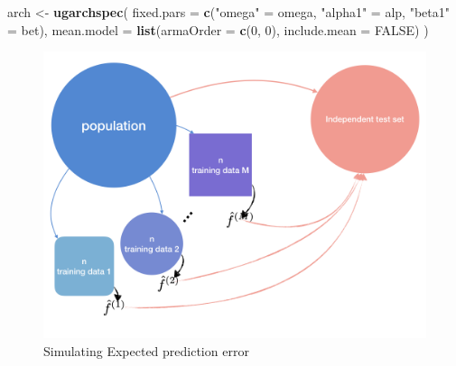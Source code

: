 \documentclass[
]{article}
\newenvironment{Shaded}{\begin{snugshade}}{\end{snugshade}}
\newcommand{\DataTypeTok}[1]{\textcolor[rgb]{0.13,0.29,0.53}{#1}}
\newcommand{\DecValTok}[1]{\textcolor[rgb]{0.00,0.00,0.81}{#1}}
\newcommand{\KeywordTok}[1]{\textcolor[rgb]{0.13,0.29,0.53}{\textbf{#1}}}
\newcommand{\NormalTok}[1]{#1}
\newcommand{\OtherTok}[1]{\textcolor[rgb]{0.56,0.35,0.01}{#1}}
\newcommand{\StringTok}[1]{\textcolor[rgb]{0.31,0.60,0.02}{#1}}
\theoremstyle{definition}
\theoremstyle{definition}
\theoremstyle{definition}
\theoremstyle{remark}
\begin{document}
\begin{Shaded}
\begin{Highlighting}[]
\NormalTok{arch <{-}}\StringTok{ }
\StringTok{  }\KeywordTok{ugarchspec}\NormalTok{(}
    \DataTypeTok{fixed.pars =} \KeywordTok{c}\NormalTok{(}\StringTok{"omega"}\NormalTok{ =}\StringTok{ }\NormalTok{omega, }\StringTok{"alpha1"}\NormalTok{ =}\StringTok{ }\NormalTok{alp, }\StringTok{"beta1"}\NormalTok{ =}\StringTok{ }\NormalTok{bet),}
    \DataTypeTok{mean.model =} \KeywordTok{list}\NormalTok{(}\DataTypeTok{armaOrder =} \KeywordTok{c}\NormalTok{(}\DecValTok{0}\NormalTok{, }\DecValTok{0}\NormalTok{), }\DataTypeTok{include.mean =} \OtherTok{FALSE}\NormalTok{)}
\NormalTok{  )}
\end{Highlighting}
\end{Shaded}

\begin{figure}[H]

{\centering \includegraphics[width=0.7\linewidth]{../docs/mc_epe} 

}

\caption{Simulating Expected prediction error}\label{fig:mctest}
\end{figure}
\end{document}
